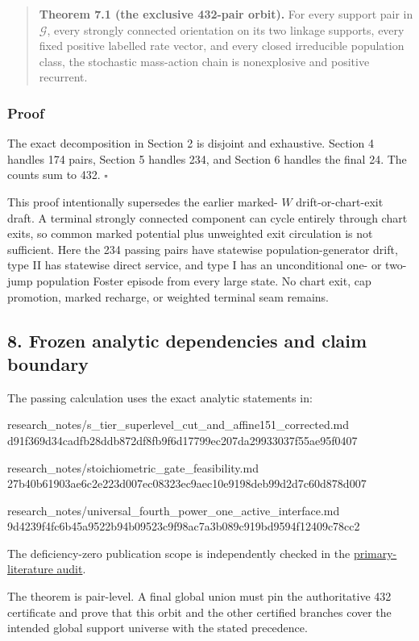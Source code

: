 \begin{quote}
\textbf{Theorem 7.1 (the exclusive 432-pair orbit).} For every support
pair in \(\mathcal G\), every strongly connected orientation on its two
linkage supports, every fixed positive labelled rate vector, and every
closed irreducible population class, the stochastic mass-action chain is
nonexplosive and positive recurrent.
\end{quote}

\subsubsection{Proof}

The exact decomposition in Section 2 is disjoint and exhaustive. Section
4 handles 174 pairs, Section 5 handles 234, and Section 6 handles the
final 24. The counts sum to 432. \(\square\)

This proof intentionally supersedes the earlier marked- \(W\)
drift-or-chart-exit draft. A terminal strongly connected component can
cycle entirely through chart exits, so common marked potential plus
unweighted exit circulation is not sufficient. Here the 234 passing
pairs have statewise population-generator drift, type II has statewise
direct service, and type I has an unconditional one- or two-jump
population Foster episode from every large state. No chart exit, cap
promotion, marked recharge, or weighted terminal seam remains.

\subsection{8. Frozen analytic dependencies and claim
boundary}

The passing calculation uses the exact analytic statements in:

\begin{CodeBlock}
research_notes/s_tier_superlevel_cut_and_affine151_corrected.md
d91f369d34cadfb28ddb872df8fb9f6d17799ec207da29933037f55ae95f0407

research_notes/stoichiometric_gate_feasibility.md
27b40b61903ae6c2e223d007ec08323ec9aec10e9198deb99d2d7c60d878d007

research_notes/universal_fourth_power_one_active_interface.md
9d4239f4fc6b45a9522b94b09523c9f98ac7a3b089c919bd9594f12409c78cc2
\end{CodeBlock}

The deficiency-zero publication scope is independently checked in the
\href{proof_first_publication_primary_literature_audit.md}{primary-literature
audit}.

The theorem is pair-level. A final global union must pin the
authoritative 432 certificate and prove that this orbit and the other
certified branches cover the intended global support universe with the
stated precedence.
